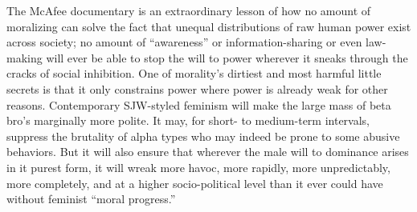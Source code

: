 \documentclass[a4paper,12pt,margin=.5in]{article}
\begin{document}
The McAfee documentary is an extraordinary lesson of how no amount of
moralizing can solve the fact that unequal distributions of raw human
power exist across society; no amount of ``awareness'' or
information-sharing or even law-making will ever be able to stop the
will to power wherever it sneaks through the cracks of social
inhibition. One of morality's dirtiest and most harmful little secrets
is that it only constrains power where power is already weak for other
reasons. Contemporary SJW-styled feminism will make the large mass of
beta bro's marginally more polite. It may, for short- to medium-term
intervals, suppress the brutality of alpha types who may indeed be prone
to some abusive behaviors. But it will also ensure that wherever the
male will to dominance arises in it purest form, it will wreak more
havoc, more rapidly, more unpredictably, more completely, and at a
higher socio-political level than it ever could have without feminist
``moral progress.''
\end{document}
